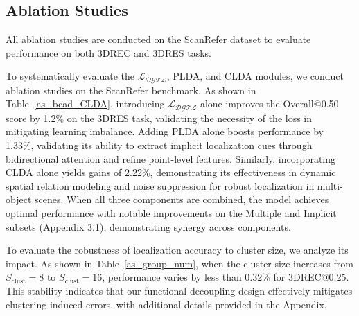 \documentclass[letterpaper]{article} %
\begin{document}
\subsection{Ablation Studies}

All ablation studies are conducted on the ScanRefer dataset to evaluate performance on both 3DREC and 3DRES tasks.


To systematically evaluate the $\mathcal{L_\text{DGTL}}$, PLDA, and CLDA modules, we conduct ablation studies on the ScanRefer benchmark. As shown in Table~\ref{as_bcad_CLDA}, introducing $\mathcal{L_\text{DGTL}}$ alone improves the Overall@0.50 score by 1.2\% on the 3DRES task, validating the necessity of the loss in mitigating learning imbalance. Adding PLDA alone boosts performance by 1.33\%, validating its ability to extract implicit localization cues through bidirectional attention and refine point-level features. Similarly, incorporating CLDA alone yields gains of 2.22\%, demonstrating its effectiveness in dynamic spatial relation modeling and noise suppression for robust localization in multi-object scenes. When all three components are combined, the model achieves optimal performance with notable improvements on the Multiple and Implicit subsets (Appendix 3.1), demonstrating synergy across components.



To evaluate the robustness of localization accuracy to cluster size, we analyze its impact. As shown in Table~\ref{as_group_num}, when the cluster size increases from $S_{\mathrm{clust}} = 8$ to $S_{\mathrm{clust}} = 16$, performance varies by less than 0.32\% for 3DREC@0.25. This stability indicates that our functional decoupling design effectively mitigates clustering-induced errors, with additional details provided in the Appendix.
\end{document}
